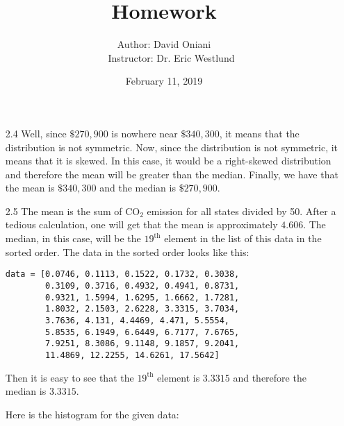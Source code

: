 \documentclass[11pt, a4paper]{article}
\title{\bf{Homework \textnumero 2}}
\author{Author: David Oniani
\\
\ \ \ Instructor: Dr. Eric Westlund}
\date{February 11, 2019}
\begin{document}
\maketitle
\begin{itemize}
\item[2.4]
Well, since $\$270, 900$ is nowhere near $\$340, 300$, it means that the distribution
is not symmetric. Now, since the distribution is not symmetric, it means that it is skewed.
In this case, it would be a right-skewed distribution and therefore the mean will
be greater than the median. Finally, we have that the mean is $\$340, 300$ and the median is $\$270, 900$.

\item[]

\item[2.5]
The mean is the sum of CO$_2$ emission for all states divided by 50. After a tedious
calculation, one will get that the mean is approximately $4.606$. The median, in this case,
will be the $19^{\text{th}}$ element in the list of this data in the sorted order.
The data in the sorted order looks like this:

\begin{center}
\begin{verbatim}
data = [0.0746, 0.1113, 0.1522, 0.1732, 0.3038,
        0.3109, 0.3716, 0.4932, 0.4941, 0.8731,
        0.9321, 1.5994, 1.6295, 1.6662, 1.7281,
        1.8032, 2.1503, 2.6228, 3.3315, 3.7034,
        3.7636, 4.131, 4.4469, 4.471, 5.5554,
        5.8535, 6.1949, 6.6449, 6.7177, 7.6765,
        7.9251, 8.3086, 9.1148, 9.1857, 9.2041,
        11.4869, 12.2255, 14.6261, 17.5642]
\end{verbatim}
\end{center}

Then it is easy to see that the $19^{\text{th}}$ element is $3.3315$
and therefore the median is $3.3315$.

Here is the histogram for the given data:
\begin{center}
\end{center}


\end{itemize}
\end{document}
